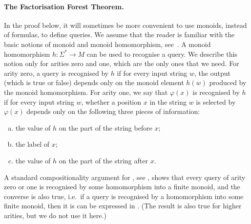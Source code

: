 \paragraph*{The Factorisation Forest Theorem.} In the proof below, it will sometimes be more convenient to use monoids, instead of \mso formulas, to define queries. We assume that the reader is familiar with the basic notions of monoid and monoid homomorphism, see~\cite[Section 1]{bojanczyk_recobook}. A monoid homomorphism $h : \Sigma^* \to M$ can be used to recognise a query. We describe this notion only for arities zero and one, which are the only ones that we need. For arity zero, a query  is recognised
 by $h$  if for every input string $w$, the output (which is true or false) depends only on the monoid element $h(w)$ produced by the  monoid homomorphism. For arity one, we say that  $\varphi(x)$ is recognised by $h$ 
    if for every input string $w$,  whether a position $x$ in the  string $w$ is selected by $\varphi(x)$ depends only on the following three pieces of information: 
    \begin{enumerate}[(a)]
        \item the value of $h$ on the part of the string before $x$;
        \item the label of $x$;
        \item the value of $h$ on the part of the string after $x$.
    \end{enumerate}
    A standard compositionality argument for \mso, see \cite[Section 2.1]{bojanczyk_recobook}, shows that every \mso query of arity zero or one is recognised by some homomorphism into a finite monoid,  and the converse is also true, i.e.~if a query is recognised by a homomorphism into some finite monoid, then it is can be expressed in \mso. (The result is also true for higher arities, but we do not use it here.)

